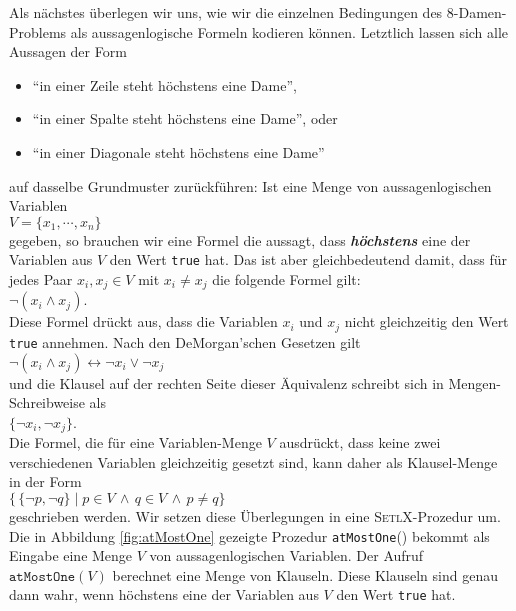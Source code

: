 Als n\"{a}chstes \"{u}berlegen wir uns, wie wir die einzelnen Bedingungen des 8-Damen-Problems 
als aussagenlogische
Formeln kodieren k\"{o}nnen.  Letztlich lassen sich alle Aussagen der Form
\begin{itemize}
\item ``in einer Zeile steht h\"{o}chstens eine Dame'', 
\item ``in einer Spalte steht h\"{o}chstens eine Dame'', oder 
\item ``in einer Diagonale steht h\"{o}chstens eine Dame'' 
\end{itemize}
auf dasselbe Grundmuster zur\"{u}ckf\"{u}hren:
Ist eine Menge von aussagenlogischen Variablen \\[0.2cm]
\hspace*{1.3cm} $V = \{ x_1, \cdots, x_n \}$ \\[0.2cm]
gegeben, so brauchen wir eine Formel die aussagt, dass \textbf{\emph{h\"{o}chstens}} eine der Variablen aus
$V$ den Wert \texttt{true} hat.  Das ist aber gleichbedeutend damit, dass f\"{u}r jedes Paar
$x_i, x_j \in V$ mit $x_i \not= x_j$ die folgende Formel gilt: \\[0.2cm]
\hspace*{1.3cm} $\neg (x_i \wedge x_j)$. \\[0.2cm]
Diese Formel dr\"{u}ckt aus, dass die Variablen $x_i$ und $x_j$ nicht gleichzeitig den Wert
\texttt{true} annehmen.  Nach den De\-Morgan'schen Gesetzen gilt
\\[0.2cm]
\hspace*{1.3cm}
$\neg (x_i \wedge x_j) \leftrightarrow \neg x_i \vee \neg x_j$
\\[0.2cm]
und die Klausel auf der rechten Seite dieser \"{A}quivalenz schreibt sich in Mengen-Schreibweise als
\\[0.2cm]
\hspace*{1.3cm}  $\{\neg x_i, \neg x_j \}$. \\[0.2cm]
Die Formel, die f\"{u}r eine Variablen-Menge $V$ ausdr\"{u}ckt, dass keine zwei verschiedenen
Variablen gleichzeitig gesetzt sind, kann daher als Klausel-Menge in der Form
\\[0.2cm]
\hspace*{1.3cm} $\bigl\{\, \{ \neg p, \neg q \} \;|\; p \in V \,\wedge\, q \in V
\,\wedge\, p \not= q \bigr\}$
\\[0.2cm]
geschrieben werden.
Wir setzen diese \"{U}berlegungen in eine \textsc{SetlX}-Prozedur um.  Die in Abbildung \ref{fig:atMostOne}
gezeigte Prozedur \texttt{atMostOne}() bekommt als Eingabe eine Menge $V$ von
aussagenlogischen Variablen.  Der Aufruf $\texttt{atMostOne}(V)$ berechnet eine Menge von
Klauseln.  Diese Klauseln sind genau dann wahr, wenn h\"{o}chstens eine der Variablen aus $V$
den Wert \texttt{true} hat.

